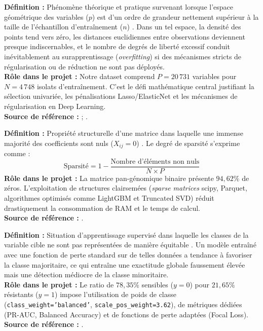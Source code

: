 \documentclass[11pt,a4paper]{article}
\begin{document}
\begin{defbox}
\textbf{Définition :} Phénomène théorique et pratique survenant lorsque l'espace géométrique des variables ($p$) est d'un ordre de grandeur nettement supérieur à la taille de l'échantillon d'entraînement ($n$) \citep{donoho2000highdim,bellman1957dynamic}. Dans un tel espace, la densité des points tend vers zéro, les distances euclidiennes entre observations deviennent presque indiscernables, et le nombre de degrés de liberté excessif conduit inévitablement au surapprentissage (\textit{overfitting}) si des mécanismes stricts de régularisation ou de réduction ne sont pas déployés.\\
\textbf{Rôle dans le projet :} Notre dataset comprend $P=20\,731$ variables pour $N=4\,748$ isolats d'entraînement. C'est le défi mathématique central justifiant la sélection univariée, les pénalisations Lasso/ElasticNet et les mécanismes de régularisation en Deep Learning.\\
\textbf{Source de référence :} \citet{bellman1957dynamic} ; \citet{donoho2000highdim}.
\end{defbox}

\begin{defbox}
\textbf{Définition :} Propriété structurelle d'une matrice dans laquelle une immense majorité des coefficients sont nuls ($X_{ij}=0$) \citep{hastie2015statistical}. Le degré de sparsité s'exprime comme :
\[
\text{Sparsité} = 1 - \frac{\text{Nombre d'éléments non nuls}}{N \times P}
\]
\textbf{Rôle dans le projet :} La matrice pan-génomique binaire présente $94,62\%$ de zéros. L'exploitation de structures clairsemées (\textit{sparse matrices} scipy, Parquet, algorithmes optimisés comme LightGBM et Truncated SVD) réduit drastiquement la consommation de RAM et le temps de calcul.\\
\textbf{Source de référence :} \citet{hastie2015statistical}.
\end{defbox}

\begin{defbox}
\textbf{Définition :} Situation d'apprentissage supervisé dans laquelle les classes de la variable cible ne sont pas représentées de manière équitable \citep{he2009learning}. Un modèle entraîné avec une fonction de perte standard sur de telles données a tendance à favoriser la classe majoritaire, ce qui entraîne une exactitude globale faussement élevée mais une détection médiocre de la classe minoritaire.\\
\textbf{Rôle dans le projet :} Le ratio de $78,35\%$ sensibles ($y=0$) pour $21,65\%$ résistants ($y=1$) impose l'utilisation de poids de classe (\texttt{class\_weight='balanced'}, \texttt{scale\_pos\_weight=3.62}), de métriques dédiées (PR-AUC, Balanced Accuracy) et de fonctions de perte adaptées (Focal Loss).\\
\textbf{Source de référence :} \citet{he2009learning}.
\end{defbox}
\end{document}
